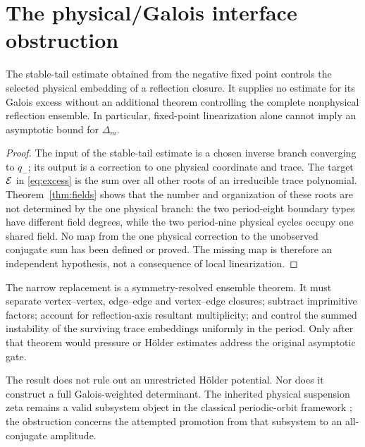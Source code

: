 \section{The physical/Galois interface obstruction}

\begin{theorem}
\label{thm:interface}
The stable-tail estimate obtained from the negative fixed point controls the
selected physical embedding of a reflection closure.  It supplies no estimate
for its Galois excess without an additional theorem controlling the complete
nonphysical reflection ensemble.  In particular, fixed-point linearization
alone cannot imply an asymptotic bound for \(\Delta_m\).
\end{theorem}

\begin{proof}
The input of the stable-tail estimate is a chosen inverse branch converging to
\(q_-\); its output is a correction to one physical coordinate and trace.
The target \(\mathcal E\) in \eqref{eq:excess} is the sum over all other roots of an
irreducible trace polynomial.  Theorem~\ref{thm:fields} shows that the number
and organization of these roots are not determined by the one physical
branch: the two period-eight boundary types have different field degrees,
while the two period-nine physical cycles occupy one shared field.  No map
from the one physical correction to the unobserved conjugate sum has been
defined or proved.  The missing map is therefore an independent hypothesis,
not a consequence of local linearization.
\end{proof}

The narrow replacement is a symmetry-resolved ensemble theorem.  It must
separate vertex--vertex, edge--edge and vertex--edge closures; subtract
imprimitive factors; account for reflection-axis resultant multiplicity; and
control the summed instability of the surviving trace embeddings uniformly
in the period.  Only after that theorem would pressure or H\"older estimates
address the original asymptotic gate.

The result does not rule out an unrestricted H\"older potential.  Nor does it
construct a full Galois-weighted determinant.  The inherited physical
suspension zeta remains a valid subsystem object in the classical
periodic-orbit framework \citep{ParryPollicott1990}; the obstruction concerns
the attempted promotion from that subsystem to an all-conjugate amplitude.
